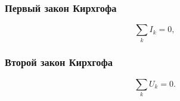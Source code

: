 \documentclass[12pt, a4paper]{article}
\begin{document}
\subsubsection*{Первый закон Кирхгофа}

\[
\sum_{k} I_k = 0,
\]

\subsubsection*{Второй закон Кирхгофа}

\[
\sum_{k} U_k = 0.
\]
\end{document}
